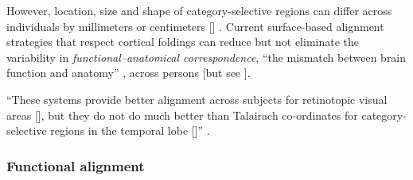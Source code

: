
However, location, size and shape of category-selective regions can differ
across individuals by millimeters or centimeters [\citep{zhen2017quantifying,
zhen2015quantifying}] \citep{feilong2018reliable}.
%
Current surface-based alignment strategies that respect cortical foldings
\citep{fischl1999cortical, fischl2012freesurfer, yeo2009spherical} can reduce
but not eliminate the variability in \textit{functional--anatomical
correspondence}, ``the mismatch between brain function and anatomy''
\citep{feilong2018reliable}, across persons
\citep{klein2010evaluation, frost2012measuring, duncan2009consistency,
weiner2018defining, weiner2014mid} [but see \citep{langers2014assessment}].

%
``These systems provide better alignment across subjects for retinotopic visual
areas [\citep{fischl1999high}], but they do not do much better than Talairach
co-ordinates for category-selective regions in the temporal lobe
[\citep{spiridon2006location}]'' \citep{saxe2006divide}.


\subsubsection{Functional alignment}


